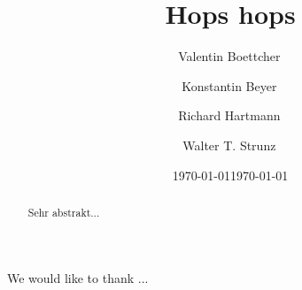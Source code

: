 \documentclass[prx,a4paper,aps,twocolumn,nofootinbib,superscriptaddress,10pt,showkeys]{revtex4-1}
\theoremstyle{plain}
\theoremstyle{plain}
\theoremstyle{plain}
\theoremstyle{remark}
\theoremstyle{plain}
\theoremstyle{plain}
\theoremstyle{definition}
\theoremstyle{plain}
\theoremstyle{plain}
\theoremstyle{plain}
\begin{document}

\title{Hops hops}
\date{\today}

\author{Valentin Boettcher\,}

\author{Konstantin Beyer\,}

\author{Richard Hartmann\,}

\author{Walter T. Strunz\,}


\date{\today}
\begin{abstract}
Sehr abstrakt...
\end{abstract}


\maketitle



\begin{acknowledgments}
We would like to thank ...
\end{acknowledgments}

\def\bibsection{\section*{References}}


\appendix

\section{ }\label{...}
\end{document}
